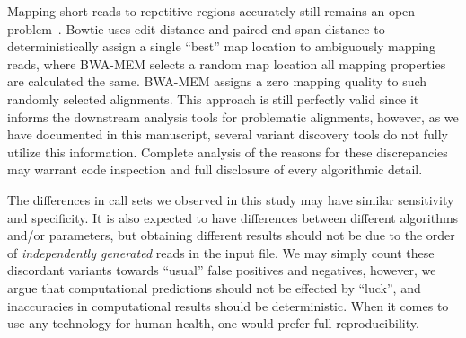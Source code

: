 \documentclass[10pt,a4paper]{article}
\newcommand {\junk}[1]{}
\begin{document}
Mapping short reads to repetitive regions accurately still remains an open problem~\cite{Treangen2012}. Bowtie uses %
edit distance and paired-end span distance 
to deterministically assign a single ``best'' map location to ambiguously mapping reads, where BWA-MEM selects a random map location all mapping properties are calculated the same. BWA-MEM assigns a zero mapping quality
to such randomly selected alignments. This approach is still perfectly valid since it informs the downstream analysis tools for problematic alignments, however, as we have documented in this manuscript, 
several variant discovery tools do not fully utilize this information. Complete analysis of the reasons for these discrepancies may warrant code inspection and full disclosure of every algorithmic detail.

The differences in call sets we observed in this study 
may have similar sensitivity and specificity.
It is also expected to
have differences between different algorithms and/or parameters, but
obtaining different results should not be due to the order of {\it independently generated} reads in the input file. 
We may simply count these discordant variants towards ``usual'' false positives and negatives, however, 
we argue that computational predictions should not be effected by ``luck'', and inaccuracies in computational results should be deterministic.
When it comes to use any technology for human health, one would prefer full reproducibility. 


\junk{
\section*{Acknowledgments}
We thank H.I. Özercan, A. Gündoğdu, A.K. Şenol, and M.Y. Özkaya for the initial observation of the effects of reshuffling reads in alignment results using BWA-MEM. We also thank M. Somel, 
O. Gokcumen, E. Cicek, and O. Tastan for
their valuable comments during the preparation of this manuscript. 

Funding for this project was provided by a Marie Curie Career Integration Grant (303772) and an 
EMBO Installation Grant (IG-2521) to C.A.


\section*{Author Contributions}
C.A. conceived the project. C.F. and C.A. analyzed the data and wrote the manuscript.

}
\end{document}
